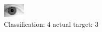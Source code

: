 \begin{figure}[h!]
\begin{center}
\includegraphics[width=0.60\columnwidth]{figures/ID2182_class_4_target_3.png}
\end{center}
\caption{ Classification: 4 actual target: 3}
\label{fig:ID2182_class_4_target_3}
\end{figure}
